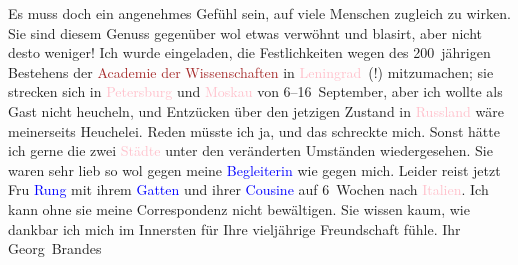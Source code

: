                     Es muss doch ein angenehmes Gefühl sein, auf viele Menschen zugleich zu wirken.
                    Sie sind diesem Genuss gegenüber wol etwas verwöhnt und blasirt, aber nicht
                    desto weniger!\pend
           \pstart
           Ich wurde eingeladen, die Festlichkeiten wegen des 200 jährigen Bestehens der \textcolor{brown}{Academie der Wissenschaften}{}\ledrightnote{\textcolor{brown}{Akademie der Wissenschaften}} in \textcolor{pink}{Leningrad}{}\ledrightnote{\textcolor{pink}{Sankt Petersburg}} (!) mitzumachen; sie strecken sich in \textcolor{pink}{Petersburg}{}\ledrightnote{\textcolor{pink}{Sankt Petersburg}} und \textcolor{pink}{Moskau}{}\ledrightnote{\textcolor{pink}{Moskau}} von 6–16 September, aber ich wollte
                    als Gast nicht heucheln, und Entzücken über den {\pb}jetzigen Zustand in \textcolor{pink}{Russland}{}\ledrightnote{\textcolor{pink}{Russland}} wäre meinerseits Heuchelei. Reden
                    müsste ich ja, und das schreckte mich. Sonst hätte ich gerne die zwei \textcolor{pink}{Städte}{} unter den
                    veränderten Umständen wiedergesehen.\pend
           \pstart
           Sie waren sehr lieb so wol gegen meine \textcolor{blue}{Begleiterin}{} wie gegen mich.\pend
           \pstart
           Leider reist jetzt Fru \textcolor{blue}{Rung}{}\ledrightnote{\textcolor{blue}{Gertrud Rung}} mit ihrem \textcolor{blue}{Gatten}{} und ihrer \textcolor{blue}{Cousine}{} auf 6 Wochen nach
                        \textcolor{pink}{Italien}{}\ledrightnote{\textcolor{pink}{Italien}}. Ich kann ohne sie meine
                    Correspondenz nicht bewältigen.\pend
           \pstart
           Sie wissen kaum, wie dankbar ich mich im Innersten für Ihre vieljährige
                    Freundschaft fühle.\pend
           \pstart Ihr \spacefill\mbox{Georg Brandes}\pend{}\endnumbering{}  
      